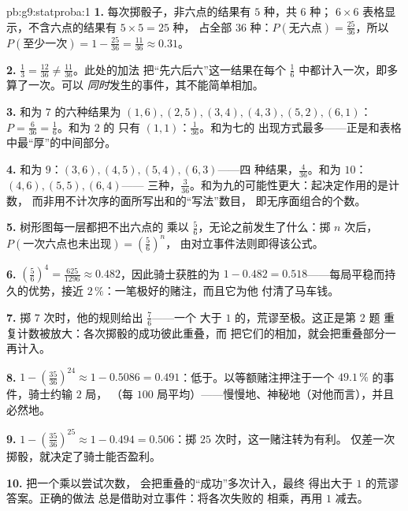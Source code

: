 \begin{solution}{pb:g9:statproba:1}
\textbf{1.} 每次掷骰子，非六点的结果有 $5$ 种，共 $6$ 种；
$6 \times 6$ 表格显示，不含六点的结果有 $5 \times 5 = 25$ 种，
占全部 $36$ 种：$P(\text{无六点}) = \frac{25}{36}$，所以
$P(\text{至少一次}) = 1 - \frac{25}{36} = \frac{11}{36}
\approx 0.31$。

\textbf{2.} $\frac13 = \frac{12}{36} \neq \frac{11}{36}$。此处的加法
把“先六后六”这一结果在每个
$\frac16$ 中都计入一次，即多算了一次。可以
\emph{同时}发生的事件，其不能简单相加。

\textbf{3.} 和为 $7$ 的六种结果为 $(1,6), (2,5), (3,4),
(4,3), (5,2), (6,1)$：$P = \frac{6}{36} = \frac16$。和为 $2$ 的
只有 $(1,1)$：$\frac{1}{36}$。和为七的
出现方式最多——正是和表格中最“厚”的中间部分。

\textbf{4.} 和为 $9$：$(3,6), (4,5), (5,4), (6,3)$——四
种结果，$\frac{4}{36}$。和为 $10$：$(4,6), (5,5), (6,4)$——
三种，$\frac{3}{36}$。和为九的可能性更大：起决定作用的是计数，
而非用不计次序的面所写出和的“写法”数目，
即无序面组合的个数。

\textbf{5.} 树形图每一层都把不出六点的
乘以 $\frac56$，无论之前发生了什么：掷 $n$
次后，$P(\text{一次六点也未出现}) = \left(\frac56\right)^n$，
由对立事件法则即得该公式。

\textbf{6.} $\left(\frac56\right)^4 = \frac{625}{1296} \approx
0.482$，因此骑士获胜的为
 $1 - 0.482 = 0.518$——每局平稳而持久的优势，接近
 $2\,\%$：一笔极好的赌注，而且它为他
付清了马车钱。

\textbf{7.} 掷 $7$ 次时，他的规则给出 $\frac76$——一个
大于 $1$ 的，荒谬至极。这正是第 2 题
重复计数被放大：各次掷骰的成功彼此重叠，而
把它们的相加，就会把重叠部分一再计入。

\textbf{8.} $1 - \left(\frac{35}{36}\right)^{24} \approx
1 - 0.5086 = 0.491$：低于。以等额赌注押注于一个
 $49.1\,\%$ 的事件，骑士约输 $2$ 局，
（每 $100$ 局平均）——慢慢地、神秘地（对他而言），并且
必然地。

\textbf{9.} $1 - \left(\frac{35}{36}\right)^{25} \approx
1 - 0.494 = 0.506$：掷 $25$ 次时，这一赌注转为有利。
仅差一次掷骰，就决定了骑士能否盈利。

\textbf{10.} 把一个乘以尝试次数，
会把重叠的“成功”多次计入，最终
得出大于 $1$ 的荒谬答案。正确的做法
总是借助对立事件：将各次失败的
相乘，再用 $1$ 减去。


\end{solution}
